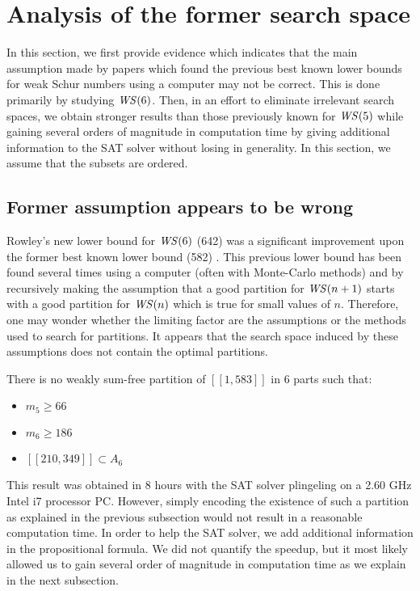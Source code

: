 \section{Analysis of the former search space}

In this section, we first provide evidence which indicates that the main assumption made by papers which
found the previous best known lower bounds for weak Schur numbers using a computer may not be correct. 
This is done primarily by studying \(\mathit{WS}(6)\). Then, in an effort to eliminate irrelevant search spaces, we 
obtain stronger results than those previously known for \(\mathit{WS} (5)\) while gaining several orders of magnitude 
in computation time by giving additional information to the SAT solver without losing in generality. In this 
section, we assume that the subsets are ordered.


\subsection{Former assumption appears to be wrong}
Rowley's new lower bound for \(\mathit{WS} (6)\) (642) \cite{RowleyWS} was a significant improvement upon
the former best known lower bound (582) \cite{EliahouBook}. This previous lower bound has been found 
several times using a computer (often with Monte-Carlo methods) and by recursively making the assumption 
that a good partition for \(\mathit{WS} (n+1)\) starts with a good partition for \(\mathit{WS} (n)\) which is true for small
values of \(n\). Therefore, one may wonder whether the limiting factor are the assumptions or the 
methods used to search for partitions. It appears that the search space induced by these assumptions does 
not contain the optimal partitions.

\begin{computational theorem}
There is no weakly sum-free partition of \([\![1,583]\!]\) in 6 parts such that:
\begin{itemize}
	\item \(m_5 \geqslant 66\)
	\item \(m_6 \geqslant 186\)
	\item \([\![210,349]\!] \subset A_6\)
\end{itemize}
\end{computational theorem}

This result was obtained in 8 hours with the SAT solver plingeling \cite{Lingeling2017} on a 2.60 GHz Intel
i7 processor PC.
However, simply encoding the existence of such a partition as explained in the previous subsection would not result in a
reasonable
computation time. In order to help the SAT solver, we add additional information in the propositional formula. We did
not quantify the
speedup, but it most likely allowed us to gain several order of magnitude in computation time as we explain in the next
subsection.

